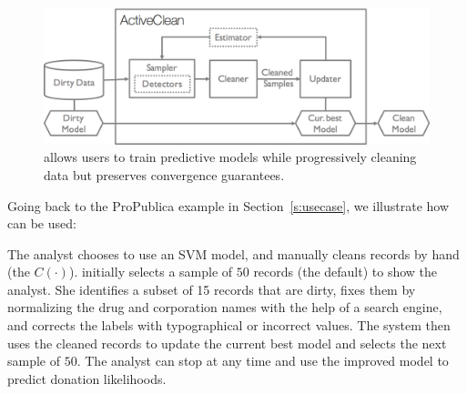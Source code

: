 \vspace{0.25em}

\begin{figure}[t]
\centering
 \includegraphics[width=\columnwidth]{figs/arch.png}
 \caption{\sysfull allows users to train predictive models while progressively cleaning data but preserves convergence guarantees. \label{sys-arch}}
\end{figure}


Going back to the ProPublica example in Section~\ref{s:usecase}, we illustrate how \sys can be used:
\begin{example}\label{archex}
The analyst chooses to use an SVM model, and manually cleans records by hand (the $C(\cdot)$).  
\sys initially selects a sample of $50$ records (the default)  to show the analyst.
She identifies a subset of 15 records that are dirty, fixes them by normalizing the drug and corporation names with the help of a search engine, and corrects the labels with typographical or incorrect values.
The system then uses the cleaned records to update the current best model and selects the next sample of $50$.
The analyst can stop at any time and use the improved model to predict donation likelihoods.
\end{example}

